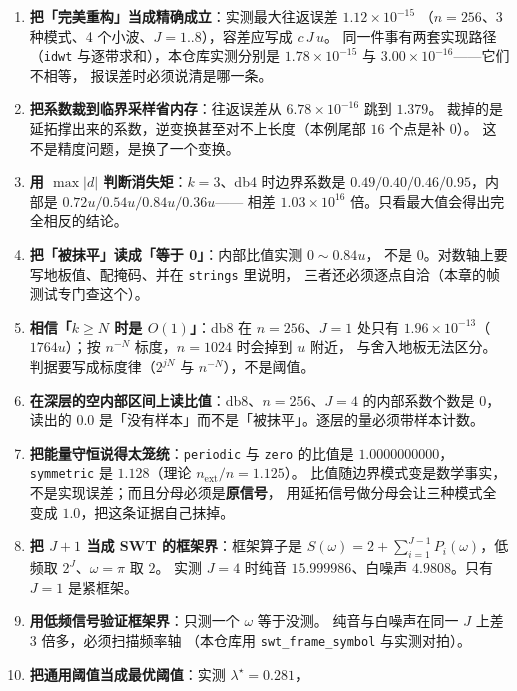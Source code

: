 \begin{enumerate}
  \item \textbf{把「完美重构」当成精确成立}：实测最大往返误差 $1.12\times10^{-15}$
        （$n=256$、3 种模式、4 个小波、$J=1..8$），容差应写成 $c\,J\,u$。
        同一件事有两套实现路径（\texttt{idwt} 与逐带求和），本仓库实测分别是
        $1.78\times10^{-15}$ 与 $3.00\times10^{-16}$——它们不相等，
        报误差时必须说清是哪一条。
  \item \textbf{把系数裁到临界采样省内存}：往返误差从 $6.78\times10^{-16}$ 跳到 $1.379$。
        裁掉的是延拓撑出来的系数，逆变换甚至对不上长度（本例尾部 $16$ 个点是补 $0$）。
        这不是精度问题，是换了一个变换。
  \item \textbf{用 $\max|d|$ 判断消失矩}：$k=3$、db4 时边界系数是
        $0.49/0.40/0.46/0.95$，内部是 $0.72u/0.54u/0.84u/0.36u$——
        相差 $1.03\times10^{16}$ 倍。只看最大值会得出完全相反的结论。
  \item \textbf{把「被抹平」读成「等于 0」}：内部比值实测 $0\sim0.84u$，
        不是 $0$。对数轴上要写地板值、配掩码、并在 \texttt{strings} 里说明，
        三者还必须逐点自洽（本章的帧测试专门查这个）。
  \item \textbf{相信「$k\ge N$ 时是 $O(1)$」}：db8 在 $n=256$、$J=1$ 处只有
        $1.96\times10^{-13}$（$1764u$）；按 $n^{-N}$ 标度，$n=1024$ 时会掉到 $u$ 附近，
        与舍入地板无法区分。判据要写成标度律（$2^{jN}$ 与 $n^{-N}$），不是阈值。
  \item \textbf{在深层的空内部区间上读比值}：db8、$n=256$、$J=4$ 的内部系数个数是
        $0$，读出的 $0.0$ 是「没有样本」而不是「被抹平」。逐层的量必须带样本计数。
  \item \textbf{把能量守恒说得太笼统}：\texttt{periodic} 与 \texttt{zero} 的比值是
        $1.0000000000$，\texttt{symmetric} 是 $1.128$（理论 $n_{\text{ext}}/n=1.125$）。
        比值随边界模式变是数学事实，不是实现误差；而且分母必须是\textbf{原信号}，
        用延拓信号做分母会让三种模式全变成 $1.0$，把这条证据自己抹掉。
  \item \textbf{把 $J+1$ 当成 SWT 的框架界}：框架算子是
        $S(\omega)=2+\sum_{i=1}^{J-1}P_i(\omega)$，低频取 $2^J$、$\omega=\pi$ 取 $2$。
        实测 $J=4$ 时纯音 $15.999986$、白噪声 $4.9808$。只有 $J=1$ 是紧框架。
  \item \textbf{用低频信号验证框架界}：只测一个 $\omega$ 等于没测。
        纯音与白噪声在同一 $J$ 上差 3 倍多，必须扫描频率轴
        （本仓库用 \texttt{swt\_frame\_symbol} 与实测对拍）。
  \item \textbf{把通用阈值当成最优阈值}：实测 $\lambda^\star=0.281$，

\end{enumerate}
